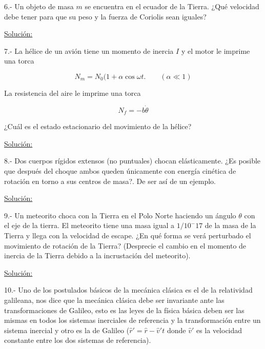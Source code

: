 \documentclass[a4paper,10pt]{article}
\begin{document}
6.- Un objeto de masa $m$ se encuentra en el ecuador de la Tierra. ¿Qué velocidad debe 
tener para que su peso y la fuerza de Coriolis sean iguales?

\vspace{.3cm}

\underline{Solución:}

\vspace{.3cm}

7.- La hélice de un avión tiene un momento de inercia $I$ y el motor le imprime una torca 

$$N_m = N_0 (1+\alpha \cos{\omega t}. \qquad (\alpha \ll 1)$$

La resistencia del aire le imprime una torca

$$N_f = -b\dot{\theta}$$

¿Cuál es el estado estacionario del movimiento de la hélice?

\vspace{.3cm}

\underline{Solución:}

\vspace{.3cm}

8.- Dos cuerpos rígidos extensos (no puntuales) chocan elásticamente. ¿Es posible que 
después del choque ambos queden únicamente con energía cinética de rotación en torno 
a sus centros de masa?. De ser así de un ejemplo.
\vspace{.3cm}

\underline{Solución:}

\vspace{.3cm}
9.- Un meteorito choca con la Tierra en el Polo Norte haciendo un ángulo $\theta$ con
el eje de la tierra. El meteorito tiene una masa igual a $1/10^-17$ de la masa de la 
Tierra y llega con la velocidad de escape. ¿En qué forma se verá perturbado el movimiento
de rotación de la Tierra? (Desprecie el cambio en el momento de inercia de la Tierra
debido a la incrustación del meteorito).
\vspace{.3cm}

\underline{Solución:}

\vspace{.3cm}

10.- Uno de los postulados básicos de la mecánica clásica es el de la relatividad galileana,
nos dice que la mecánica clásica debe ser invariante ante las transformaciones de Galileo, 
esto es las leyes de la física básica deben ser las mismas en todos los sistemas inerciales
de referencia y la transformación entre un sistema inercial y otro es la de Galileo 
($\hat{r}' = \hat{r} - \hat{v}'t$ donde $\hat{v}'$ es la velocidad constante entre los dos 
sistemas de referencia).
\end{document}
